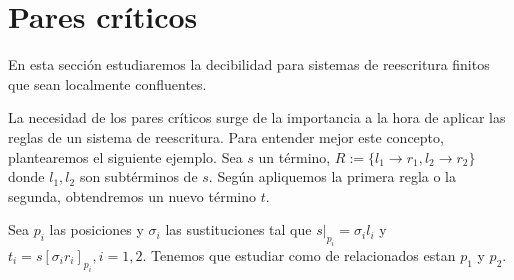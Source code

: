 \section{Pares críticos}

En esta sección estudiaremos la decibilidad para sistemas de
reescritura finitos que sean localmente confluentes.

La necesidad de los pares críticos surge de la importancia a la hora
de aplicar las reglas de un sistema de reescritura. Para entender
mejor este concepto, plantearemos el siguiente ejemplo. Sea $s$ un
término, $R := \{ l_1 \rightarrow r_1, l_2 \rightarrow r_2 \}$ donde
$l_1, l_2$ son subtérminos de $s$. Según apliquemos la primera regla o
la segunda, obtendremos un nuevo término $t$.

\begin{figure}[h]
  \centering
\end{figure}

Sea $p_i$ las posiciones y $\sigma_i$ las sustituciones tal que
$s|_{p_i} = \sigma_i l_i$ y $t_i = s[\sigma_i r_i ]_{p_i}, i
=1,2$. Tenemos que estudiar como de relacionados estan $p_1$ y $p_2$.

